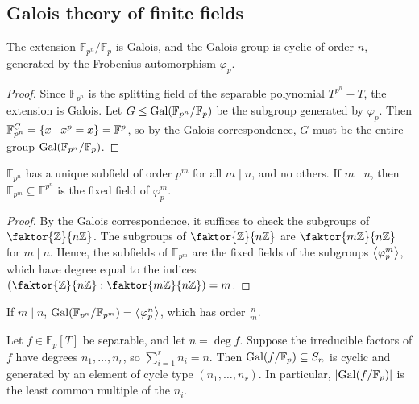 \subsection{Galois theory of finite fields}
\begin{theorem}
	The extension \( \mathbb F_{p^n} / \mathbb F_p \) is Galois, and the Galois group is cyclic of order \( n \), generated by the Frobenius automorphism \( \varphi_p \).
\end{theorem}
\begin{proof}
	Since \( \mathbb F_{p^n} \) is the splitting field of the separable polynomial \( T^{p^n} - T \), the extension is Galois.
	Let \( G \leq \operatorname{Gal}(\mathbb F_{p^n} / \mathbb F_p) \) be the subgroup generated by \( \varphi_p \).
	Then \( \mathbb F_{p^n}^G = \qty{x \mid x^p = x} = \mathbb F^p \), so by the Galois correspondence, \( G \) must be the entire group \( \operatorname{Gal}(\mathbb F_{p^n} / \mathbb F_p) \).
\end{proof}
\begin{theorem}
	\( \mathbb F_{p^n} \) has a unique subfield of order \( p^m \) for all \( m \mid n \), and no others.
	If \( m \mid n \), then \( \mathbb F_{p^m} \subseteq \mathbb F^{p^n} \) is the fixed field of \( \varphi_p^m \).
\end{theorem}
\begin{proof}
	By the Galois correspondence, it suffices to check the subgroups of \( \faktor{\mathbb Z}{n\mathbb Z} \).
	The subgroups of \( \faktor{\mathbb Z}{n\mathbb Z} \) are \( \faktor{m\mathbb Z}{n\mathbb Z} \) for \( m \mid n \).
	Hence, the subfields of \( \mathbb F_{p^m} \) are the fixed fields of the subgroups \( \left\langle{} \varphi_p^m \right\rangle \), which have degree equal to the indices \( \qty(\faktor{\mathbb Z}{n\mathbb Z} : \faktor{m\mathbb Z}{n\mathbb Z}) = m \).
\end{proof}
\begin{remark}
	If \( m \mid n \), \( \operatorname{Gal}(\mathbb F_{p^n} / \mathbb F_{p^m}) = \left\langle{} \varphi_p^n \right\rangle \), which has order \( \frac{n}{m} \).
\end{remark}
\begin{theorem}
	Let \( f \in \mathbb F_p[T] \) be separable, and let \( n = \deg f \).
	Suppose the irreducible factors of \( f \) have degrees \( n_1, \dots, n_r \), so \( \sum_{i=1}^r n_i = n \).
	Then \( \operatorname{Gal}(f/\mathbb F_p) \subseteq S_n \) is cyclic and generated by an element of cycle type \( (n_1, \dots, n_r) \).
	In particular, \( \abs{\operatorname{Gal}(f/\mathbb F_p)} \) is the least common multiple of the \( n_i \).
\end{theorem}
